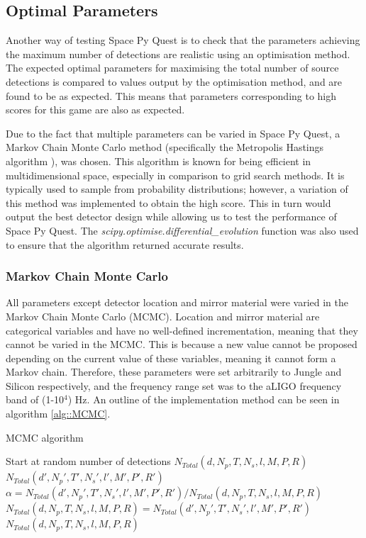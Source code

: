 \documentclass{article}
\begin{document}
\subsection{Optimal Parameters}
Another way of testing Space Py Quest is to check that the parameters
achieving the maximum number of detections are realistic using an
optimisation method. The expected optimal parameters for maximising
the total number of source detections is compared to values output by
the optimisation method, and are found to be as expected. This means
that parameters corresponding to high scores for this game are also as
expected. 

Due to the fact that multiple parameters can be varied in Space Py
Quest, a Markov Chain Monte Carlo method (specifically the Metropolis
Hastings algorithm \cite{metropolis, hastings}), was chosen. This
algorithm is known for being efficient in multidimensional space,
especially in comparison to grid search methods. It is typically used
to sample from probability distributions; however, a variation of this
method was implemented to obtain the high score. This in turn would
output the best detector design while allowing us to test the
performance of Space Py Quest. The
\textit{scipy.optimise.differential\_evolution} \cite{scipy} function
was also used to ensure that the algorithm returned accurate results. 

\subsubsection{Markov Chain Monte Carlo}
All parameters except detector location and mirror material were
varied in the Markov Chain Monte Carlo (MCMC). Location and mirror
material are categorical variables and have no well-defined
incrementation, meaning that they cannot be varied in the MCMC. This
is because a new value cannot be proposed depending on the current
value of these variables, meaning it cannot form a Markov
chain. Therefore, these parameters were set arbitrarily to Jungle and
Silicon respectively, and the frequency range set was to the aLIGO
frequency band of (1-10$^4$) Hz. An outline of the implementation
method can be seen in algorithm \ref{alg::MCMC}.

\begin{algorithm}
\caption{MCMC algorithm}
\label{alg::MCMC}
\begin{algorithmic}
\item{Start at random number of detections} $N_{Total}(d, N_p, T, N_s, l, M, P, R)$ 
    \State {} $N_{Total}(d', N_p', T', N_s', l', M', P', R')$
    \State $\alpha = N_{Total}(d', N_p', T', N_s', l', M', P', R')/N_{Total}(d, N_p, T, N_s, l, M, P, R)$
    \State $N_{Total}(d, N_p, T, N_s, l, M, P, R) = N_{Total}(d', N_p', T', N_s', l', M', P', R')$
    \EndIf
    \State {} $N_{Total}(d, N_p, T, N_s, l, M, P, R)$
\EndFor
\end{algorithmic}
\end{algorithm}
\end{document}

